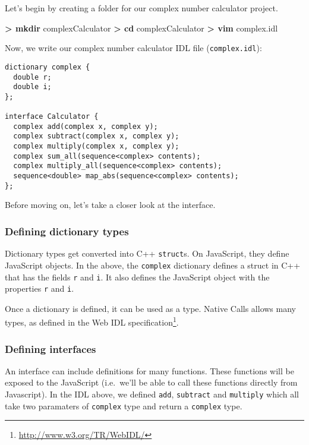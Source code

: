 \documentclass[]{article}
\newenvironment{Shaded}{}{}
\newcommand{\KeywordTok}[1]{\textcolor[rgb]{0.00,0.44,0.13}{\textbf{{#1}}}}
\newcommand{\NormalTok}[1]{{#1}}
\begin{document}
Let's begin by creating a folder for our complex number calculator
project.

\begin{Shaded}
\begin{Highlighting}[]
\KeywordTok{> mkdir} \NormalTok{complexCalculator}
\KeywordTok{> cd} \NormalTok{complexCalculator}
\KeywordTok{> vim} \NormalTok{complex.idl}
\end{Highlighting}
\end{Shaded}

Now, we write our complex number calculator IDL file
(\texttt{complex.idl}):

\begin{verbatim}
dictionary complex {
  double r;
  double i;
};

interface Calculator {
  complex add(complex x, complex y);
  complex subtract(complex x, complex y);
  complex multiply(complex x, complex y);
  complex sum_all(sequence<complex> contents);
  complex multiply_all(sequence<complex> contents);
  sequence<double> map_abs(sequence<complex> contents);
};
\end{verbatim}

Before moving on, let's take a closer look at the interface.

\subsubsection{Defining dictionary
types}\label{defining-dictionary-types}

Dictionary types get converted into C++ \texttt{struct}s. On JavaScript,
they define JavaScript objects. In the above, the \texttt{complex}
dictionary defines a struct in C++ that has the fields \texttt{r} and
\texttt{i}. It also defines the JavaScript object with the properties
\texttt{r} and \texttt{i}.

Once a dictionary is defined, it can be used as a type. Native Calls
allows many types, as defined in the
Web IDL specification\footnote{\url{http://www.w3.org/TR/WebIDL/}}.

\subsubsection{Defining interfaces}\label{defining-interfaces}

An interface can include definitions for many functions. These functions
will be exposed to the JavaScript (i.e.~we'll be able to call these
functions directly from Javascript). In the IDL above, we defined
\texttt{add}, \texttt{subtract} and \texttt{multiply} which all take two
paramaters of \texttt{complex} type and return a \texttt{complex} type.
\end{document}
